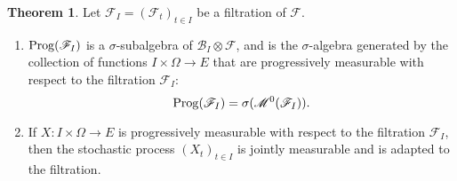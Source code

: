 \documentclass{article}
\newcommand{\Prog}{\ensuremath\mathrm{Prog}}
\theoremstyle{definition}
\newtheorem{theorem}{Theorem}
\theoremstyle{definition}
\begin{document}
\begin{theorem}
Let $\mathscr{F}_I=(\mathscr{F}_t)_{t \in I}$ be a filtration of $\mathscr{F}$.
\begin{enumerate}
\item $\Prog(\mathscr{F}_I)$ is a $\sigma$-subalgebra of $\mathscr{B}_I \otimes \mathscr{F}$, and  is the
$\sigma$-algebra generated by the collection of functions $I \times \Omega \to E$ that 
are progressively measurable with respect to the filtration $\mathscr{F}_I$:
\[
\Prog(\mathscr{F}_I)=\sigma(\mathscr{M}^0(\mathscr{F}_I)).
\]
\item If $X:I \times \Omega \to E$ is progressively measurable with respect to the filtration
$\mathscr{F}_I$, then the stochastic process $(X_t)_{t \in I}$ is jointly measurable and is adapted to the filtration.
\end{enumerate}
\end{theorem}
\end{document}
